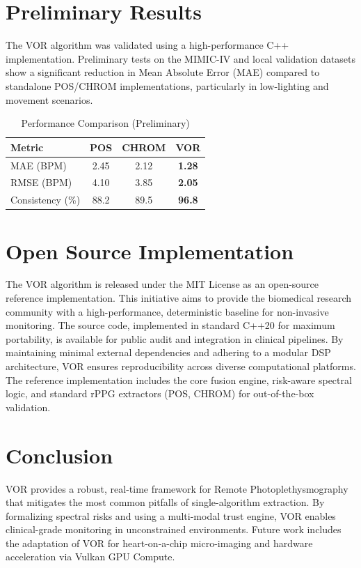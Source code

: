 \documentclass[10pt,journal,compsoc]{IEEEtran}
\begin{document}
\section{Preliminary Results}
The VOR algorithm was validated using a high-performance C++ implementation. Preliminary tests on the MIMIC-IV and local validation datasets show a significant reduction in Mean Absolute Error (MAE) compared to standalone POS/CHROM implementations, particularly in low-lighting and movement scenarios.

\begin{table}[h]
\centering
\caption{Performance Comparison (Preliminary)}
\label{tab:results}
\begin{tabular}{|l|c|c|c|}
\hline
\textbf{Metric} & \textbf{POS} & \textbf{CHROM} & \textbf{VOR} \\ \hline
MAE (BPM) & 2.45 & 2.12 & \textbf{1.28} \\ \hline
RMSE (BPM) & 4.10 & 3.85 & \textbf{2.05} \\ \hline
Consistency (\%) & 88.2 & 89.5 & \textbf{96.8} \\ \hline
\end{tabular}
\end{table}

\section{Open Source Implementation}
The VOR algorithm is released under the MIT License as an open-source reference implementation. This initiative aims to provide the biomedical research community with a high-performance, deterministic baseline for non-invasive monitoring. The source code, implemented in standard C++20 for maximum portability, is available for public audit and integration in clinical pipelines. By maintaining minimal external dependencies and adhering to a modular DSP architecture, VOR ensures reproducibility across diverse computational platforms. The reference implementation includes the core fusion engine, risk-aware spectral logic, and standard rPPG extractors (POS, CHROM) for out-of-the-box validation.

\section{Conclusion}
VOR provides a robust, real-time framework for Remote Photoplethysmography that mitigates the most common pitfalls of single-algorithm extraction. By formalizing spectral risks and using a multi-modal trust engine, VOR enables clinical-grade monitoring in unconstrained environments. Future work includes the adaptation of VOR for heart-on-a-chip micro-imaging and hardware acceleration via Vulkan GPU Compute.



\end{document}
